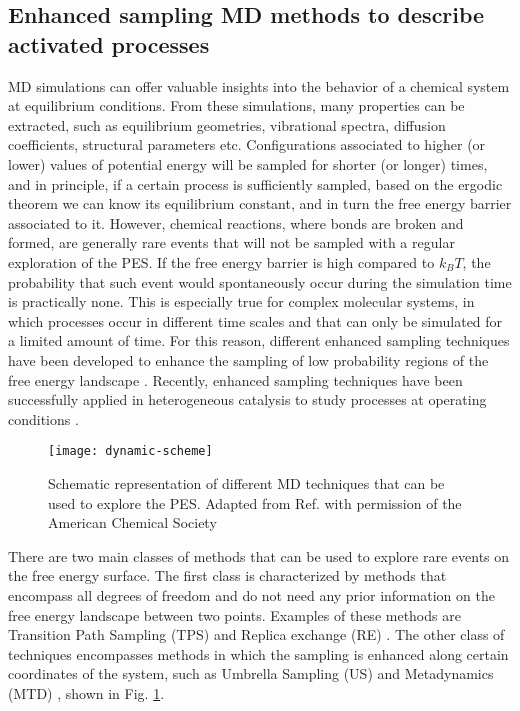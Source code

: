 \subsection*{Enhanced sampling MD methods to describe activated processes}
MD simulations can offer valuable insights into the behavior of a chemical system at equilibrium conditions. From these simulations, many properties can be extracted, such as equilibrium geometries, vibrational spectra, diffusion coefficients, structural parameters etc. Configurations associated to higher (or lower) values of potential energy will be sampled for shorter (or longer) times, and in principle, if a certain process is sufficiently sampled, based on the ergodic theorem we can know its equilibrium constant, and in turn the free energy barrier associated to it. However, chemical reactions, where bonds are broken and formed, are generally rare events that will not be sampled with a regular exploration of the PES. If the free energy barrier is high compared to $k_{B}T$, the probability that such event would spontaneously occur during the simulation time is practically none. This is especially true for complex molecular systems, in which processes occur in different time scales and that can only be simulated for a limited amount of time. For this reason, different enhanced sampling techniques have been developed to enhance the sampling of low probability regions of the free energy landscape \cite{valsson2016enhancing, laio2002escaping, sutto2012new, carter1989constrained, darve2001calculating, jarzynski1997nonequilibrium, rosso2002use, gullingsrud1999reconstructing}. Recently, enhanced sampling techniques have been successfully applied in heterogeneous catalysis to study processes at operating conditions \cite{dewispelaere2016insight, dewispelaere2015complex, vanspeybroeck2014first, cnudde2017effect, haigis2015hydrothermal, buvcko2011monomolecular, fraux2017recent}.
\npar
\begin{figure}[!htbp]
	\centering
 	\texttt{[image: dynamic-scheme]}
	\caption{Schematic representation of different MD techniques that can be used to explore the PES. Adapted from Ref. \cite{demuynck2017efficient} with permission of the American Chemical Society}
	\label{fig:dynamic-scheme}
\end{figure}

There are two main classes of methods that can be used to explore rare events on the free energy surface. The first class is characterized by methods that encompass all degrees of freedom and do not need any prior information on the free energy landscape between two points. Examples of these methods are Transition Path Sampling (TPS) \cite{dellago2002transition} and Replica exchange (RE) \cite{sugita1999replica}. The other class of techniques encompasses methods in which the sampling is enhanced along certain coordinates of the system, such as Umbrella Sampling (US) \cite{torrie1977nonphysical, patey1975monte} and Metadynamics (MTD) \cite{laio2002escaping}, shown in Fig. \ref{fig:dynamic-scheme}.


